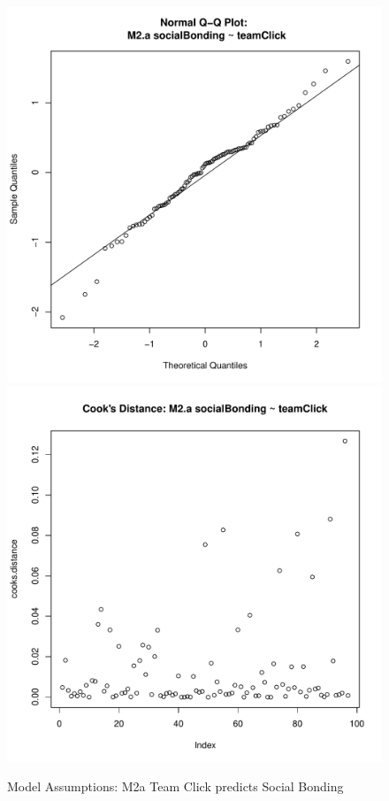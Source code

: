 \documentclass[12pt]{report}
\begin{document}
{\begin{figure}[htbp]
  \includegraphics[scale =.4]{../images/MLM2aQQNorm.pdf}
  \includegraphics[scale =.4]{../images/MLM2aCooksD.pdf}
  \caption{Model Assumptions: M2a Team Click predicts Social Bonding}
  \label{fig:MKM2aAssumptions}
\end{figure}









}
\end{document}
